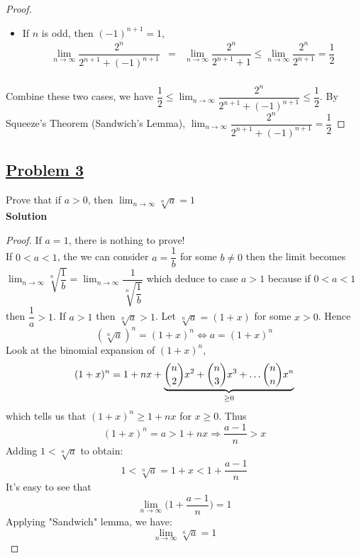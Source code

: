 \documentclass[10pt,letterpaper]{article}
\newcommand{\sol}{\textbf{Solution}}
\begin{document}
\begin{enumerate}[label=(\roman{*})]
\begin{proof}
\begin{itemize}
			\item If $n$ is odd, then $(-1)^{n+1} = 1$, 
			\begin{eqnarray*}
				\displaystyle\lim_{n\to \infty} \dfrac{2^n}{2^{n+1} + (-1)^{n+1}}  &=&
				\displaystyle\lim_{n\to \infty} \dfrac{2^n}{2^{n+1} + 1} 
				\leq  \displaystyle\lim_{n\to \infty} \dfrac{2^n}{2^{n+1}} = \dfrac{1}{2}\\
			\end{eqnarray*}
			\end{itemize}
			Combine these two cases, we have
			$\dfrac{1}{2} \leq \displaystyle\lim_{n\to \infty} \dfrac{2^n}{2^{n+1} + (-1)^{n+1}} \leq \dfrac{1}{2}$.
			By Squeeze's Theorem (Sandwich's Lemma), 
			$\displaystyle\lim_{n\to \infty} \dfrac{2^n}{2^{n+1} + (-1)^{n+1}} = \dfrac{1}{2}$
		\end{proof}
	\end{enumerate}
	
	\subsection*{{\color{red}\underline{Problem 3}}}
	Prove that if $a > 0$, then $\displaystyle\lim_{n\to \infty} \sqrt[n]{a} = 1$ \\
	\sol 
	\begin{proof}
	If $a = 1$, there is nothing to prove! \\
	If $0 < a < 1$, the we can consider $a = \dfrac{1}{b}$ for some $b \neq 0$ then the limit becomes
	$\displaystyle\lim_{n\to\infty}\sqrt[n]{\dfrac{1}{b}} = 
	\displaystyle\lim_{n\to\infty} \dfrac{1}{\sqrt[n]{\dfrac{1}{b}}}$
	which deduce to case $a > 1$ because if $0 < a < 1$ then $\dfrac{1}{a} > 1$.
	If $a > 1$ then $\sqrt[n]{a} > 1$. Let $\sqrt[n]{a} = (1 + x)$ for some $x > 0$. Hence
	$$(\sqrt[n]{a})^n = (1 + x)^n \Leftrightarrow a = (1 + x)^n$$
	Look at the binomial expansion of $(1 + x)^n$,
	$$(1 + x)^n = 1 + nx + \underbrace{\dbinom{n}{2}x^2 + \dbinom{n}{3}x^3 + \ldots \dbinom{n}{n}x^n
	}_{\geq 0}$$
	which tells us that $(1 + x)^n \geq 1 + nx$ for $x \geq 0$. Thus
	$$(1 + x)^n = a > 1 + nx \Rightarrow \dfrac{a - 1}{n} > x$$
	Adding $1 < \sqrt[n]{a}$ to obtain:
	$$1 < \sqrt[n]{a} = 1 + x < 1 + \dfrac{a - 1}{n}$$
	It's easy to see that 
	$$\displaystyle\lim_{n\to\infty} \bigg(1 + \dfrac{a - 1}{n}\bigg) = 1$$
	Applying "Sandwich" lemma, we have:
	$$\displaystyle\lim_{n\to\infty} \sqrt[n]{a} = 1$$
	\end{proof}
	
\end{document}
